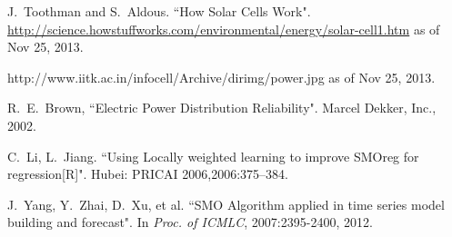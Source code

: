 \documentclass[a4paper,12pt]{llncs}
\begin{document}
\medskip
\begin{thebibliography}{1}
J.~Toothman and S.~Aldous. ``How Solar Cells Work". \url{http://science.howstuffworks.com/environmental/energy/solar-cell1.htm} as of Nov 25, 2013.

http://www.iitk.ac.in/infocell/Archive/dirimg/power.jpg as of  Nov 25, 2013.

R.~E.~Brown,  ``Electric Power Distribution Reliability". Marcel Dekker, Inc., 2002.

 C.~Li, L.~Jiang. ``Using Locally weighted learning to
improve SMOreg for regression[R]". Hubei: PRICAI 2006,2006:375–384.

J.~Yang, Y.~Zhai, D.~Xu, et al. ``SMO Algorithm applied in
time series model building and forecast". In {\em Proc. of ICMLC}, 2007:2395-2400, 2012.

\end{thebibliography}
\end{document}
